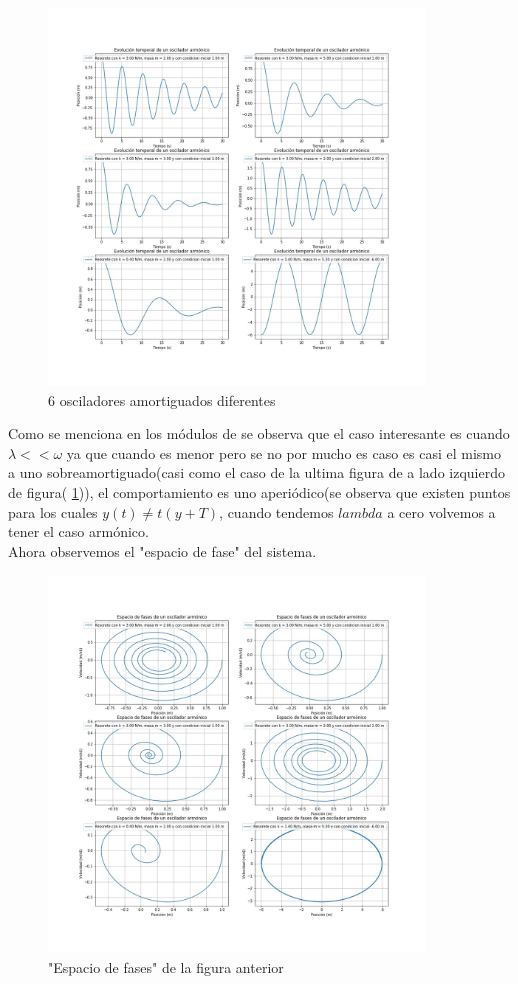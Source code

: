 \documentclass[12pt,a4paper]{article}
\begin{document}
\begin{figure}[H]
    \centering
    \includegraphics[width=10cm]{oscilador_amortiguado.jpg}
    \caption{6 osciladores amortiguados diferentes}
    \label{fig:oscilador_amortiguado}
\end{figure}

Como se menciona en los módulos de \cite{Landau2004} se observa que el caso interesante es cuando $\lambda << \omega$ ya que cuando es menor pero se no por mucho es caso es casi el mismo a uno sobreamortiguado(casi como el caso de la ultima figura de a lado izquierdo de figura( \ref{fig:oscilador_amortiguado})), el comportamiento es uno aperiódico(se observa que existen puntos para los cuales $y(t) \neq t(y + T)$, cuando tendemos $lambda$ a cero volvemos a tener el caso armónico.
\\

Ahora observemos el "espacio de fase" del sistema.

\begin{figure}[H]
    \centering
    \includegraphics[width=10cm]{fases_oscilador_amortiguado.jpg}
    \caption{"Espacio de fases" de la figura anterior}
    \label{fig:osciladorfases}
\end{figure}
\end{document}
